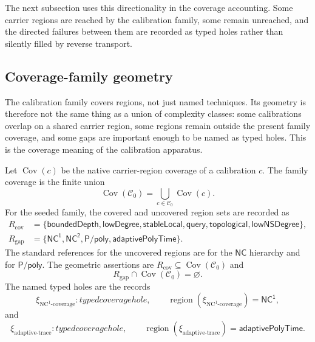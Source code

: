 \documentclass[11pt]{article}
\newcommand{\TypedHole}{typed coverage hole}
\newcommand{\xiNCone}{\xi_{\text{NC}^{1}\text{-coverage}}}
\newcommand{\xiAdaptive}{\xi_{\text{adaptive-trace}}}
\theoremstyle{definition}
\begin{document}
The next subsection uses this directionality in the coverage accounting.
Some carrier regions are reached by the calibration family, some remain
unreached, and the directed failures between them are recorded as typed
holes rather than silently filled by reverse transport.

\subsection{Coverage-family geometry}\label{sec:calibration:coverage-family-geometry}

The calibration family covers regions, not just named techniques.  Its
geometry is therefore not the same thing as a union of complexity classes:
some calibrations overlap on a shared carrier region, some regions remain
outside the present family coverage, and some gaps are important enough
to be named as typed holes.  This is the coverage meaning of the
calibration apparatus.

Let \(\operatorname{Cov}(c)\) be the native carrier-region coverage of a
calibration \(c\).  The family coverage is the finite union
\[
  \operatorname{Cov}(\mathcal C_0)
  =
  \bigcup_{c\in\mathcal C_0}\operatorname{Cov}(c).
\]
For the seeded family, the covered and uncovered region sets are recorded
as
\[
\begin{aligned}
  R_{\mathrm{cov}}
  &=
  \{\mathsf{boundedDepth},\mathsf{lowDegree},\mathsf{stableLocal},
    \mathsf{query},\mathsf{topological},\mathsf{lowNSDegree}\},\\
  R_{\mathrm{gap}}
  &=
  \{\mathsf{NC^1},\mathsf{NC^2},\mathsf{P/poly},
    \mathsf{adaptivePolyTime}\}.
\end{aligned}
\]
The standard references for the uncovered regions are
\cite{Cook1985NCTaxonomy} for the \(\mathsf{NC}\) hierarchy and
\cite{KarpLipton1982Advice} for \(\mathsf{P/poly}\).
The geometric assertions are \(R_{\mathrm{cov}}\subseteq
\operatorname{Cov}(\mathcal C_0)\) and
\[
  R_{\mathrm{gap}}\cap\operatorname{Cov}(\mathcal C_0)=\varnothing.
\]
The named typed holes are the records
\[
  \xiNCone:\TypedHole,
  \qquad
  \operatorname{region}(\xiNCone)=\mathsf{NC^1},
\]
and
\[
  \xiAdaptive:\TypedHole,
  \qquad
  \operatorname{region}(\xiAdaptive)=\mathsf{adaptivePolyTime}.
\]
\end{document}
